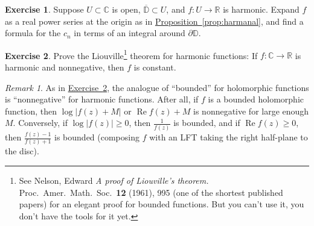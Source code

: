 \documentclass[12pt,openany]{book}
\renewcommand{\Re}{\operatorname{Re}}
\newcommand{\sabs}[1]{\lvert {#1} \rvert}
\newcommand{\C}{{\mathbb{C}}}
\newcommand{\R}{{\mathbb{R}}}
\newcommand{\D}{{\mathbb{D}}}
\newcommand{\myquote}[1]{``#1''}
\theoremstyle{plain}
\theoremstyle{remark}
\newtheorem{remark}[thm]{Remark}
\theoremstyle{definition}
\newenvironment{exbox}{%
    \def\FrameCommand{\vrule width 1pt \relax\hspace{10pt}}%
    \MakeFramed{\advance\hsize-\width\FrameRestore}%
}{%
    \endMakeFramed
}
\theoremstyle{exercise}
\newtheorem{exercise}{Exercise}[section]
\theoremstyle{example}
\newcommand{\exerciseref}[1]{\hyperref[#1]{Exercise~\ref*{#1}}}
\newcommand{\propref}[1]{\hyperref[#1]{Proposition~\ref*{#1}}}
\begin{document}
\begin{savenotes}
\begin{exbox}
\begin{exercise}
Suppose $U \subset \C$ is open, $\overline{\D} \subset U$,
and $f \colon U \to \R$ is harmonic.  Expand
$f$ as a real power series at the origin as in \propref{prop:harmanal}, and find a formula
for the $c_n$ in terms
of an integral around $\partial \D$.
\end{exercise}

\begin{exercise}\label{exercise:Liouvilleharmonic}
\pagebreak[2]
Prove the Liouville\footnote{%
See
Nelson, Edward
\emph{A proof of Liouville's theorem.}
Proc.\ Amer.\ Math.\ Soc.\ {\textbf{12}} (1961), 995
(one of the shortest published papers) for
an elegant proof for bounded functions.
But you can't use it, you don't have the
tools for it yet.} theorem for
harmonic functions:  If $f \colon \C \to \R$ is harmonic
and nonnegative, then $f$ is constant.
\end{exercise}
\end{exbox}
\end{savenotes}

\begin{remark}
As in \exerciseref{exercise:Liouvilleharmonic},
the analogue of \myquote{bounded} for holomorphic functions is
\myquote{nonnegative}
for harmonic functions.  After all, if $f$ is
a bounded holomorphic function, then $\log \sabs{f(z)+M}$ or $\Re f(z) + M$
is nonnegative for large enough $M$.  Conversely, if $\log \sabs{f(z)} \geq
0$, then $\frac{1}{f(z)}$ is bounded, and if $\Re f(z) \geq 0$, then
$\frac{f(z)-1}{f(z)+1}$ is bounded (composing $f$ with an LFT taking the
right half-plane to the disc).
\end{remark}
\end{document}
